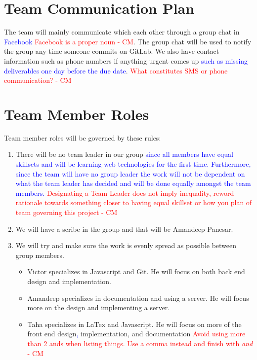\documentclass{article}
\begin{document}
\section{Team Communication Plan}
The team will mainly communicate which each other through a group chat in \textcolor{blue}{Facebook} \textcolor{red}{ Facebook is a proper noun - CM}. The group chat will be used to notify the group any time someone commits on GitLab. We also have contact information such as phone numbers if anything urgent comes up \textcolor{blue}{such as missing deliverables one day before the due date}. \textcolor{red}{What constitutes SMS or phone communication?  - CM} 
\section{Team Member Roles}
Team member roles will be governed by these rules:
\begin{enumerate}
\item There will be no team leader in our group \textcolor{blue}{since all members have equal skillsets and will be learning web technologies for the first time. Furthermore, since the team will have no group leader the work will not be dependent on what the team leader has decided and will be done equally amongst the team members.} \textcolor{red}{ Designating a Team Leader does not imply inequality, reword rationale towards something closer to having equal skillset or how you plan of team governing this project - CM} 
\item We will have a scribe in the group and that will be Amandeep Panesar.
\item We will try and make sure the work is evenly spread as possible between group members.
\begin{itemize}
\item Victor specializes in Javascript and Git. He will focus on both back end design and implementation.
\item Amandeep specializes in documentation and using a server. He will focus more on the design and implementing a server.
\item Taha specializes in LaTex and Javascript. He will focus on more of the front end design\textcolor{blue}{,} implementation, and documentation \textcolor{red}{Avoid using more than 2 ands when listing things. Use a comma instead and finish with \textit{and} - CM} 
\end{itemize}
\end{enumerate}
\end{document}
